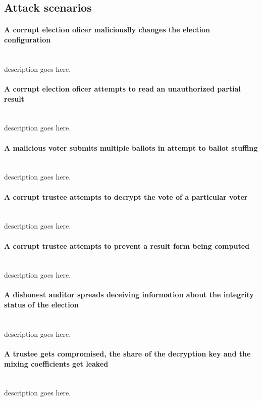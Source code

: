 \subsection{Attack scenarios} \label{sec: attack scenarios}


\paragraph{A corrupt election oficer maliciouslly changes the election configuration} \mbox{} \\
description goes here.


\paragraph{A corrupt election oficer attempts to read an unauthorized partial result} \mbox{} \\
description goes here.


\paragraph{A malicious voter submits multiple ballots in attempt to ballot stuffing} \mbox{} \\
description goes here.


\paragraph{A corrupt trustee attempts to decrypt the vote of a particular voter} \mbox{} \\
description goes here.


\paragraph{A corrupt trustee attempts to prevent a result form being computed} \mbox{} \\
description goes here.


\paragraph{A dishonest auditor spreads deceiving information about the integrity status of the election} \mbox{} \\
description goes here.


\paragraph{A trustee gets compromised, the share of the decryption key and the mixing coefficients get leaked} \mbox{} \\
description goes here.


